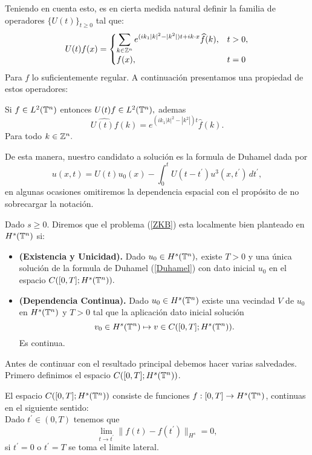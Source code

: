 Teniendo en cuenta esto, es en cierta medida natural definir la familia de operadores $\{U(t)\}_{t\geq 0}$ tal que:
$$U(t)f(x)=\begin{cases}
    \displaystyle\sum_{k\in\mathbb{Z}^n}e^{(ik_1|k|^2-|k^2|)t+ik\cdot x}\widehat{f}(k), & t>0,\\
    f(x), &t=0
\end{cases}$$
Para $f$ lo suficientemente regular. A continuación presentamos una propiedad de estos operadores:
\begin{prop}\label{FourierUt}
    Si $f\in L^2(\mathbb{T}^n)$ entonces $U(t)f\in L^2(\mathbb{T}^n),$ ademas
    $$\hat{U(t)f}(k)=e^{(ik_1|k|^2-|k^2|)t}\hat{f}(k).$$
    Para todo $k\in \mathbb{Z}^n.$ 
 \end{prop} 


De esta manera, nuestro candidato a solución es la formula de Duhamel dada por
\begin{equation}\label{Duhamel}
u(x,t)=U(t)u_0(x)-\int_0^tU(t-t^\prime)u^3(x,t^\prime)\,dt^\prime,
\end{equation}
en algunas ocasiones omitiremos la dependencia espacial con el propósito de no sobrecargar la notación.
\begin{definition}
    Dado $s\geq 0.$ Diremos que el problema (\ref{ZKB}) esta localmente bien planteado en $H^s(\mathbb{T}^n)$ si:
    \begin{itemize}
        \item \textbf{(Existencia y Unicidad).} Dado $u_0\in H^s(\mathbb{T}^n),$ existe $T>0$ y una única solución de la formula de Duhamel (\ref{Duhamel}) con dato inicial $u_0$ en el espacio $C([0,T];H^s(\mathbb{T}^n)).$
        \item \textbf{(Dependencia Continua).} Dado $u_0\in H^s(\mathbb{T}^n)$ existe una vecindad $V$ de $u_0$ en $H^s(\mathbb{T}^n)$ y $T>0$ tal que la aplicación dato inicial solución 
        $$v_0\in H^s(\mathbb{T}^n)\mapsto v\in C([0,T];H^s(\mathbb{T}^n)). $$ 
        Es continua.
    \end{itemize}
\end{definition}
Antes de continuar con el resultado principal debemos hacer varias salvedades. Primero definimos el espacio $C([0,T];H^s(\mathbb{T}^n))$.
\begin{definition}
     El espacio $C([0,T];H^s(\mathbb{T}^n))$ consiste de funciones $f:[0,T]\to H^s(\mathbb{T}^n)$, continuas en el siguiente sentido:\\ 
 Dado $t^\prime\in(0,T)$ tenemos que
$$\lim_{t\to t^\prime}\|f(t)-f(t^\prime)\|_{H^s}=0,$$
si $t^\prime=0$ o $t^\prime=T$ se toma el limite lateral.
 \end{definition}
